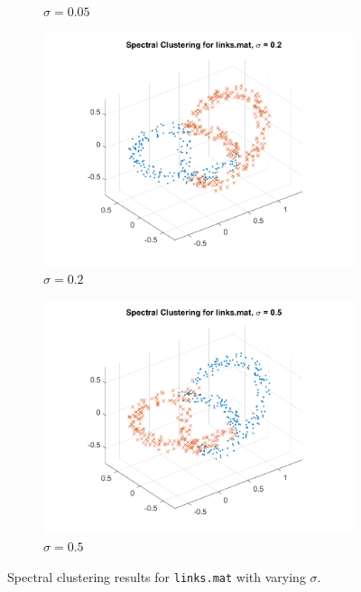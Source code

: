 \documentclass[11pt]{article}
\begin{document}
\begin{figure}[!ht]
\begin{subfigure}{0.45\textwidth}
        \caption{\(\sigma = 0.05\)}
    \end{subfigure}
    \begin{subfigure}{0.45\textwidth}
        \includegraphics[width=\linewidth]{links_sigma_0.200.png}
        \caption{\(\sigma = 0.2\)}
    \end{subfigure}
    \begin{subfigure}{0.45\textwidth}
        \includegraphics[width=\linewidth]{links_sigma_0.500.png}
        \caption{\(\sigma = 0.5\)}
    \end{subfigure}
    \caption{Spectral clustering results for \texttt{links.mat} with varying \(\sigma\).}
    \label{fig:links}
\end{figure}
\end{document}
